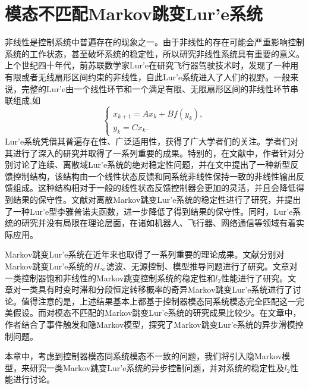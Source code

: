 
\chapter{模态不匹配Markov跳变Lur'e系统}
	非线性是控制系统中普遍存在的现象之一。由于非线性的存在可能会严重影响控制系统的工作状态，甚至破坏系统的稳定性，所以研究非线性系统具有重要的意义。上个世纪四十年代，前苏联数学家Lur'e在研究飞行器驾驶技术时，发现了一种用有限或者无线扇形区间约束的非线性，自此Lur'e系统\cite{lurie1957some}进入了人们的视野。一般来说，完整的Lur'e由一个线性环节和一个满足有限、无限扇形区间的非线性环节串联组成\cite{khalil2002nonlinear},如
	\begin{equation}
		\left\{
			\begin{array}{lr}
			x_{k+1}=Ax_k+Bf(y_k),\\
			y_k=Cx_k.
			\end{array}
		\right.
	\end{equation}
	Lur'e系统凭借其普遍存在性、广泛适用性，获得了广大学者们的关注。学者们对其进行了深入的研究并取得了一系列重要的成果\cite{kalman1963lyapunov,park2002stability,suykens1997nonlinear,cao2005synchronization}。特别的，在文献\cite{castelan2006absolute,castelan2008control}中，作者针对分别讨论了连续、离散域Lur'e系统的绝对稳定性问题，并在文中提出了一种新型反馈控制结构，该结构由一个线性状态反馈和同系统非线性保持一致的非线性输出反馈组成。这种结构相对于一般的线性状态反馈控制器会更加的灵活，并且会降低得到结果的保守性。文献\cite{gonzaga2012stability}对离散Markov跳变Lur'e系统的稳定性进行了研究，并提出了一种Lur'e型李雅普诺夫函数，进一步降低了得到结果的保守性。同时，Lur'e系统的研究并没有局限在理论层面，在诸如机器人\cite{mahmoud1994globally,chen1999controlling}、飞行器\cite{leonov2012aircraft}、网络通信\cite{li2006stability}等领域有着实际应用。
	
	Markov跳变Lur'e系统在近年来也取得了一系列重要的理论成果。文献\cite{zhu2015distributed,zhang2017resilient,zhang2015model}分别对Markov跳变Lur'e系统的$H_\infty$滤波、无源控制、模型推导问题进行了研究。文章\cite{gonzaga2014stochastic,song2012stability}对一类控制器饱和非线性的Markov跳变控制系统的稳定性和$l_2$性能进行了研究。文章\cite{wu2012stochastic}对一类具有时变时滞和分段恒定转移概率的奇异Markov跳变Lur'e系统进行了讨论。值得注意的是，上述结果基本上都基于控制器模态同系统模态完全匹配这一完美假设。而对模态不匹配的Markov跳变Lur'e系统的研究成果比较少。在文章\cite{song2018event}中，作者结合了事件触发和隐Markov模型，探究了Markov跳变Lur'e系统的异步滑模控制问题。
	
	本章中，考虑到控制器模态同系统模态不一致的问题，我们将引入隐Markov模型，来研究一类Markov跳变Lur'e系统的异步控制问题，并对系统的稳定性及$l_2$性能进行讨论。

